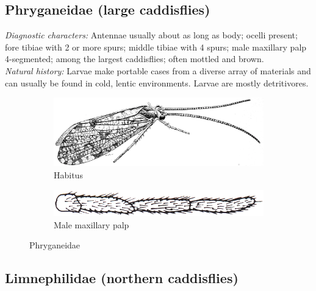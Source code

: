 \documentclass[letterpaper, 11pt]{article}
\begin{document}
\subsection{Phryganeidae (large caddisflies)}
\noindent{}\textit{Diagnostic characters:} Antennae usually about as long as body; ocelli present; fore tibiae with 2 or more spurs; middle tibiae with 4 spurs; male maxillary palp 4-segmented; among the largest caddisflies; often mottled and brown.\\

\noindent{}\textit{Natural history:} Larvae make portable cases from a diverse array of materials and can usually be found in cold, lentic environments. Larvae are mostly detritivores.

\begin{figure}[ht!]
    \centering
    \begin{subfigure}[ht!]{0.68\textwidth}
        \includegraphics[width=\textwidth]{PhryganeidHabitus}
        \caption{Habitus \citep[][Fig. 591]{bhl50956}}
        \label{fig:phrygan1}
    \end{subfigure}
    \hfill %
    \begin{subfigure}[ht!]{0.25\textwidth}
        \includegraphics[width=\textwidth]{TrichoImage01}
        \caption{Male maxillary palp \citep[][Fig. 64]{bhl50956}}
        \label{fig:phrygan2}
    \end{subfigure}
    \caption{Phryganeidae}\label{fig:phrygan}
\end{figure}

\subsection{Limnephilidae (northern caddisflies)}
\end{document}

